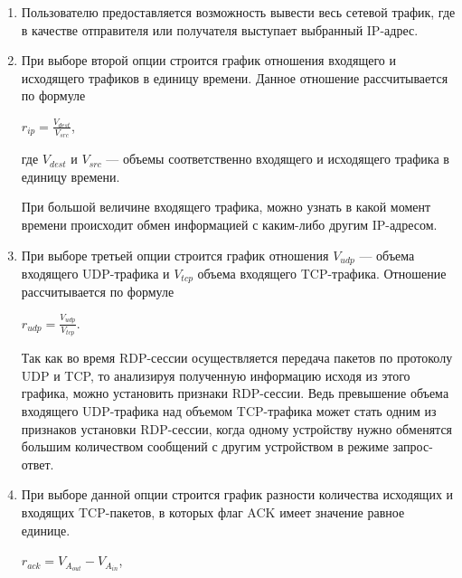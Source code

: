 \documentclass[bachelor, och, coursework]{SCWorks}
\begin{document}
  \begin{enumerate}
    \item Пользователю предоставляется возможность вывести весь сетевой трафик, где в качестве отправителя или получателя выступает выбранный IP-адрес.
    \item При выборе второй опции строится график отношения входящего и исходящего трафиков в единицу времени. Данное отношение рассчитывается по формуле
    
    \begin{center}
      $r_{ip} = \frac{V_{dest}}{V_{src}}$,
    \end{center}

    где $V_{dest}$ и $V_{src}$ --- объемы соответственно входящего и исходящего трафика в единицу времени. 
     
    При большой величине входящего трафика, можно узнать в какой момент времени происходит обмен информацией с каким-либо другим IP-адресом.
    \item При выборе третьей опции строится график отношения $V_{udp}$ --- объема входящего UDP-трафика и $V_{tcp}$ объема входящего TCP-трафика.
    Отношение рассчитывается по формуле

    \begin{center}
      $r_{udp} = \frac{V_{udp}}{V_{tcp}}$.
    \end{center}

    Так как во время RDP-сессии осуществляется передача пакетов по протоколу UDP и TCP, то анализируя полученную информацию исходя из этого графика,
    можно установить признаки RDP-сессии. Ведь превышение объема входящего UDP-трафика над объемом TCP-трафика может стать одним из признаков установки
    RDP-сессии, когда одному устройству нужно обменятся большим количеством сообщений с другим устройством в режиме запрос-ответ.  

    \item При выборе данной опции строится график разности количества исходящих и входящих TCP-пакетов, в которых флаг ACK имеет значение
    равное единице.

    \begin{center}
      $r_{ack} = V_{A_{out}} - V_{A_{in}}$,
    \end{center}


\end{enumerate}
\end{document}
